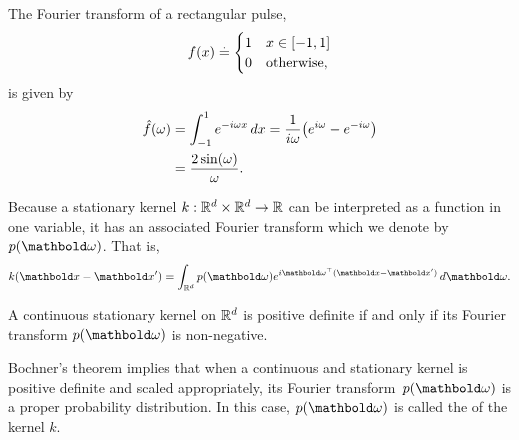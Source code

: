 \begin{marginfigure}
  \caption{The Fourier transform of a rectangular pulse, \begin{align*}
    f(x) \overset{.}{=} \begin{cases}
      1 & x \in [-1, 1] \\
      0 & \text{otherwise},
    \end{cases}
  \end{align*} is given by \begin{align*}
    \hat{f}(\omega) &= \int_{-1}^1 e^{- i \omega x} \,dx = \frac{1}{i \omega} \parentheses*{e^{i \omega} - e^{- i \omega}} \\
    &= \frac{2 \sin(\omega)}{\omega}.
  \end{align*}}\label{fig:fourier_transform}
\end{marginfigure}

Because a stationary kernel $k : \mathbb{R}^d \times \mathbb{R}^d \to \mathbb{R}$ can be interpreted as a function in one variable, it has an associated Fourier transform which we denote by $p(\vomega)$.
That is, \begin{align}
  k(\vx-\vxp) = \int_{\R^d} p(\vomega) e^{i \transpose{\vomega} (\vx-\vxp)} \,d\vomega. \label{eq:spectral_density}
\end{align}

\begin{fct}
  A continuous stationary kernel on $\mathbb{R}^d$ is positive definite if and only if its Fourier transform $p(\vomega)$ is non-negative.
\end{fct}

Bochner's theorem implies that when a continuous and stationary kernel is positive definite and scaled appropriately, its Fourier transform~$p(\vomega)$ is a proper probability distribution.
In this case, $p(\vomega)$ is called the  of the kernel $k$.

